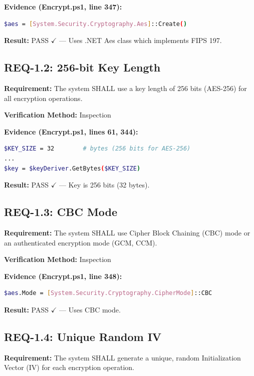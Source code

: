 \documentclass[11pt,letterpaper]{article}
\begin{document}
\begin{samepage}
\textbf{Evidence (Encrypt.ps1, line 347):}
\begin{lstlisting}[language=bash]
$aes = [System.Security.Cryptography.Aes]::Create()
\end{lstlisting}
\textbf{Result:} PASS $\checkmark$ --- Uses .NET Aes class which implements FIPS 197.
\end{samepage}

\subsection{REQ-1.2: 256-bit Key Length}

\textbf{Requirement:} The system SHALL use a key length of 256 bits (AES-256) for all encryption operations.

\textbf{Verification Method:} Inspection

\begin{samepage}
\textbf{Evidence (Encrypt.ps1, lines 61, 344):}
\begin{lstlisting}[language=bash]
$KEY_SIZE = 32        # bytes (256 bits for AES-256)
...
$key = $keyDeriver.GetBytes($KEY_SIZE)
\end{lstlisting}
\textbf{Result:} PASS $\checkmark$ --- Key is 256 bits (32 bytes).
\end{samepage}

\subsection{REQ-1.3: CBC Mode}

\textbf{Requirement:} The system SHALL use Cipher Block Chaining (CBC) mode or an authenticated encryption mode (GCM, CCM).

\textbf{Verification Method:} Inspection

\begin{samepage}
\textbf{Evidence (Encrypt.ps1, line 348):}
\begin{lstlisting}[language=bash]
$aes.Mode = [System.Security.Cryptography.CipherMode]::CBC
\end{lstlisting}
\textbf{Result:} PASS $\checkmark$ --- Uses CBC mode.
\end{samepage}

\subsection{REQ-1.4: Unique Random IV}

\textbf{Requirement:} The system SHALL generate a unique, random Initialization Vector (IV) for each encryption operation.
\end{document}
